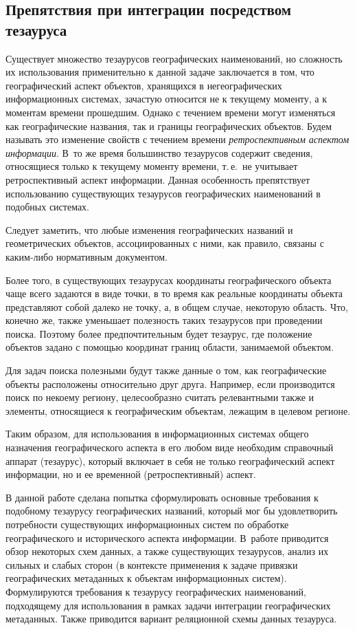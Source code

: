 \begin{multicols}{2}
  \section{Препятствия при интеграции посредством тезауруса}
  
  Существует множество тезаурусов географических наименований, но сложность их 
использования применительно к данной задаче заключается в том, что географический 
аспект объектов, хранящихся в негеографических информационных системах, зачастую 
относится не к текущему моменту, а к моментам времени прошедшим. Однако с течением 
времени могут изменяться как географические названия, так и границы географических 
объектов. Будем называть это изменение свойств с течением времени 
\textit{ретроспективным аспектом информации}. В~то же время большинство тезаурусов 
содержит сведения, относящиеся только к текущему моменту времени, т.\,е.\ не учитывает 
ретроспективный аспект информации. Данная особенность препятствует использованию 
существующих тезаурусов географических наименований в подобных системах. 
  
  Следует заметить, что любые изменения географических названий и геометрических 
объектов, ассоциированных с ними, как правило, связаны с каким-либо нормативным 
документом.
  
  Более того, в существующих тезаурусах координаты географического объекта чаще всего 
задаются в виде точки, в то время как реальные координаты объекта представляют собой 
далеко не точку, а, в общем случае, некоторую область. Что, конечно же, также уменьшает 
полезность таких тезаурусов при проведении поиска. Поэтому более предпочтительным 
будет тезаурус, где положение объектов задано с помощью координат границ области, 
занимаемой объектом.
  
  Для задач поиска полезными будут также данные о том, как географические объекты 
расположены относительно друг друга. Например, если производится поиск по некоему 
региону, целесообразно считать релевантными также и элементы, относящиеся к 
географическим объектам, лежащим в целевом регионе.
  
  Таким образом, для использования в информационных системах общего назначения 
географического аспекта в его любом виде необходим справочный аппарат (тезаурус), 
который включает в себя не только географический аспект информации, но и ее временной 
(ретроспективный) аспект.
  
  В данной работе сделана попытка сформулировать основные требования к подобному 
тезаурусу географических названий, который мог бы удовлетворить потребности 
существующих информационных систем по обработке географического и исторического 
аспекта информации. В~работе приводится обзор некоторых схем данных, а также 
существующих тезаурусов, анализ их сильных и слабых сторон (в контексте применения к 
задаче привязки географических метаданных к объектам информационных систем). 
Формулируются требования к тезаурусу географических наименований, подходящему для 
использования в рамках задачи интеграции географических метаданных. Также приводится 
вариант реляционной схемы данных тезауруса.
  

\end{multicols}

